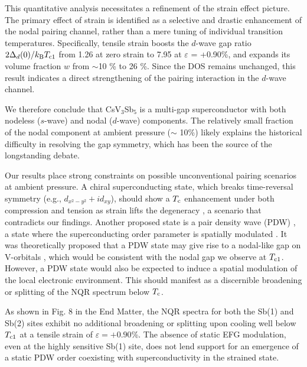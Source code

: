 \documentclass[aps,prl,twocolumn,superscriptaddress]{revtex4-2}
\begin{document}
This quantitative analysis necessitates a refinement of the strain effect picture. The primary effect of strain is identified as a selective and drastic enhancement of the nodal pairing channel, rather than a mere tuning of individual transition temperatures. Specifically, tensile strain boosts the $d$-wave gap ratio $2\Delta_d(0)/k_{\rm B}T_{\rm c1}$ from 1.26 at zero strain to 7.95 at $\varepsilon$ = +0.90\%, and expands its volume fraction $w$ from $\sim$10 \% to 26 \%. Since the DOS remains unchanged, this result indicates a direct strengthening of the pairing interaction in the $d$-wave channel.







We therefore conclude that CsV$_3$Sb$_5$ is a multi-gap superconductor with both nodeless ($s$-wave) and nodal ($d$-wave) components. The relatively small fraction of the nodal component at ambient pressure ($\sim$ 10\%) likely explains the historical difficulty in resolving the gap symmetry, which has been the source of the longstanding debate.


Our results place strong constraints on possible unconventional pairing scenarios at ambient pressure. A chiral superconducting state, which breaks time-reversal symmetry (e.g.,  $d_{x^2-y^2}+id_{xy}$), should show a $T_{\rm c}$ enhancement under both compression and tension as strain lifts the degeneracy \cite{SigristUeda}, a scenario that contradicts our findings. Another proposed state is a pair density wave (PDW) \cite{Chen_PDW,DengNature}, a state where the superconducting order parameter is spatially modulated \cite{Fradkin}. It was theoretically proposed that a PDW state may give rise to a nodal-like gap on V-orbitals \cite{JXYin_PRB}, which would be consistent with the nodal gap we observe at $T_{\rm c1}$. However, a PDW state would also be expected to induce a spatial modulation of the local electronic environment. This should manifest as a discernible broadening or splitting of the NQR spectrum below $T_{\rm c}$.


As shown in Fig. 8 in the End Matter, the NQR spectra for both the Sb(1) and Sb(2) sites exhibit no additional broadening or splitting upon cooling well below $T_{\rm c1}$ at a tensile strain of $\varepsilon = +0.90$\%. The absence of static EFG modulation, even at the highly sensitive Sb(1) site, does not lend support for an emergence of a static PDW order coexisting with superconductivity in the strained state.
\end{document}
